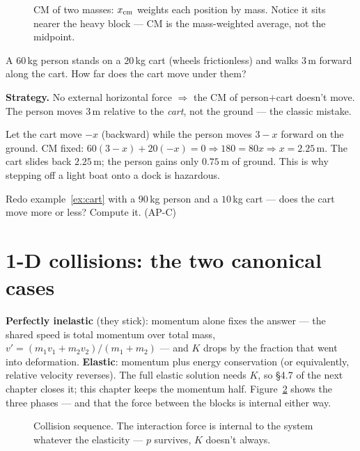 \begin{figure}[htbp]\centering

\caption{CM of two masses: $x_{\rm cm}$ weights each position by mass.
Notice it sits nearer the heavy block --- CM is the mass-weighted average,
not the midpoint.}
\label{fig:cm}
\end{figure}

\begin{example}\label{ex:cart}
A $60$\,kg person stands on a $20$\,kg cart (wheels frictionless) and walks
$3$\,m forward along the cart. How far does the cart move under them?
\par\smallskip
\textbf{Strategy.} No external horizontal force $\Rightarrow$ the CM of
person$+$cart doesn't move. The person moves $3$\,m relative to the
\emph{cart}, not the ground --- the classic mistake.
\begin{solution}
Let the cart move $-x$ (backward) while the person moves $3-x$ forward on
the ground. CM fixed:
$60(3-x)+20(-x)=0 \Rightarrow 180=80x \Rightarrow x=2.25$\,m.
The cart slides back $2.25$\,m; the person gains only $0.75$\,m of ground.
This is why stepping off a light boat onto a dock is hazardous. \checkmark
\end{solution}
\end{example}

\begin{exercise}[easy]
Redo example~\ref{ex:cart} with a $90$\,kg person and a $10$\,kg cart ---
does the cart move more or less? Compute it. (AP-C)
\end{exercise}

\section{1-D collisions: the two canonical cases}\label{sec:mom-1d}

\textbf{Perfectly inelastic} (they stick): momentum alone fixes the
answer --- the shared speed is total momentum over total mass,
$v'=(m_1v_1+m_2v_2)/(m_1+m_2)$ --- and $K$ drops by the fraction that
went into deformation. \textbf{Elastic}: momentum plus energy conservation
(or equivalently, relative velocity reverses). The full elastic solution
needs $K$, so \S4.7 of the next chapter closes it; this chapter keeps the
momentum half. Figure~\ref{fig:collseq} shows the three phases --- and that
the force between the blocks is internal either way.

\begin{figure}[htbp]\centering

\caption{Collision sequence. The interaction force is internal to the
system whatever the elasticity --- $p$ survives, $K$ doesn't always.}
\label{fig:collseq}
\end{figure}

